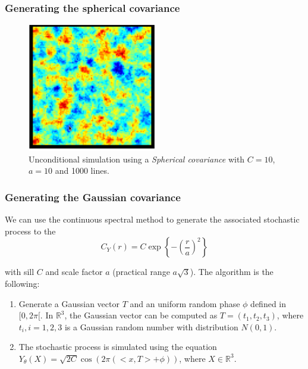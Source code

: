 \documentclass{beamer}
\begin{document}
\begin{frame}
 \frametitle{Generating the spherical covariance}
 
\begin{figure}
\begin{center}
\includegraphics[width=0.5\textwidth]{spherical_simulation_a=10_C=10.pdf}
\end{center}
\caption{Unconditional simulation using a \textit{Spherical covariance} with $C = 10$, $a = 10$ and 1000 lines.}
\label{fig:spherical_unc_simulation}
\end{figure}
\end{frame}

\begin{frame}
 \frametitle{Generating the Gaussian covariance}
 
 We can use the continuous spectral method \cite{e2006} to generate the associated stochastic process to the 
 \begin{equation}
  C_Y(r) = C \exp\left\{-\left(\frac{r}{a}\right)^2\right\}
 \end{equation}

 with sill $C$ and scale factor $a$ (practical range $a\sqrt 3$). The algorithm is the following:
 
 \begin{enumerate}
  \item Generate a Gaussian vector $T$ and an uniform random phase $\phi$ defined in $[0,2\pi[$. In $\mathbb{R}^3$, the Gaussian vector can be computed
  as $T=(t_1, t_2, t_3)$, where $t_i, i = 1, 2, 3$ is a Gaussian random number with distribution $N(0,1)$.
  \item The stochastic process is simulated using the equation 
  $Y_\theta(X) = \sqrt{2C} \cos(2\pi(<x, T> + \phi))$, 
  where $X \in \mathbb{R}^3$.
 \end{enumerate}

 
\end{frame}
\end{document}
